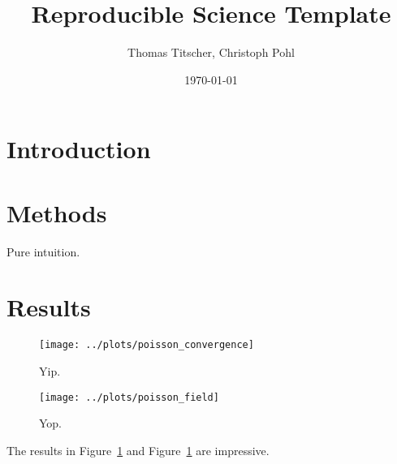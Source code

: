 \documentclass[12pt,abstract]{scrartcl}
\title{Reproducible Science Template}
\author{Thomas Titscher, Christoph Pohl}
\date{\today}
\begin{document}
\maketitle

\begin{abstract}
  \lipsum[10]
\end{abstract}

\section{Introduction}

\lipsum[10]

\section{Methods}

Pure intuition.

\section{Results}

\begin{figure}[bt]
  \centering
  \texttt{[image: ../plots/poisson\_convergence]}
  \caption{Yip.}%
  \label{fig:poisson_convergence}
\end{figure}

\begin{figure}[bt]
  \centering
  \texttt{[image: ../plots/poisson\_field]}
  \caption{Yop.}%
  \label{fig:poisson_field}
\end{figure}

The results in Figure~\ref{fig:poisson_convergence} and Figure~\ref{fig:poisson_convergence} are impressive.
\end{document}
